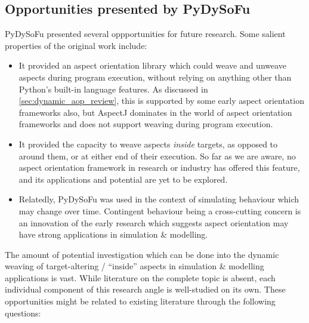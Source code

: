 \subsection{Opportunities presented by PyDySoFu}

PyDySoFu presented several oppportunities for future research. Some salient
properties of the original work include:

\begin{itemize}
    \item It provided an aspect orientation library which could weave and
    unweave aspects during program execution, without relying on anything other
    than Python's built-in language features. As discussed in
    \cref{sec:dynamic_aop_review}, this is supported by some early aspect
    orientation frameworks also, but AspectJ dominates in the world of aspect
    orientation frameworks and does not support weaving during program execution.
    \item It provided the capacity to weave aspects \emph{inside} targets, as
    opposed to around them, or at either end of their execution. So far as we
    are aware, no aspect orientation framework in research or industry has
    offered this feature, and its applications and potential are yet to be
    explored.
    \item Relatedly, PyDySoFu was used in the context of simulating behaviour which may change
    over time. Contingent behaviour being a cross-cutting concern is an
    innovation of the early research which suggests aspect orientation may have
    strong applications in \sociotechnical simulation \& modelling.
\end{itemize}


The amount of potential investigation which can be done into the dynamic weaving
of target-altering / ``inside'' aspects in simulation \& modelling applications
is vast. While literature on the complete topic is absent, each individual
component of this research angle is well-studied on its own. These opportunities
might be related to existing literature through the following questions:

